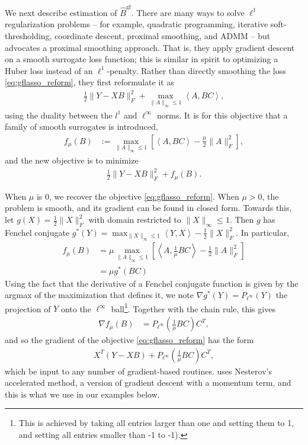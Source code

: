 \documentclass[14pt]{extarticle}
\begin{document}
We next describe estimation of $\hat{B}^{\text{gf}}$. There are many ways to
solve $\ell^{1}$ regularization problems -- for example, quadratic programming,
iterative soft-thresholding, coordinate descent, proximal smoothing, and ADMM --
but \cite{chen2010graph} advocates a proximal smoothing approach. That is, they
apply gradient descent on a smooth surrogate loss function; this is similar in
spirit to optimizing a Huber loss instead of an $\ell^{1}$-penalty. Rather than
directly smoothing the loss \ref{eq:gflasso_reform}, they first reformulate it
as
\begin{align*}
  \frac{1}{2}\|Y - XB\|_{F}^{2} + \max_{\|A\|_{\infty} \leq 1}
  \left<A, BC\right>,
\end{align*}
using the duality between the $l^{1}$ and $\ell^{\infty}$ norms. It is
for this objective that a family of smooth surrogates is introduced,
\begin{align*}
f_{\mu}\left(B\right) &:= \max_{\|A\|_{\infty} \leq 1}
\left[\left<A, BC\right> - \frac{\mu}{2}\|A\|_{F}^{2}\right],
\end{align*}
and the new objective is to minimize
\begin{align*}
\frac{1}{2}\|Y - XB\|_{F}^{2} + f_{\mu}\left(B\right).
\end{align*}

When $\mu$ is 0, we recover the objective \ref{eq:gflasso_reform}. When $\mu >
0$, the problem is smooth, and its gradient can be found in closed form. Towards
this, let $g\left(X\right) = \frac{1}{2}\|X\|_{F}^{2}$ with domain restricted to
$\|X\|_{\infty} \leq 1$. Then $g$ has Fenchel conjugate $g^{\ast}\left(Y\right)
= \max_{\|X\|_{\infty}\leq 1}\left<Y, X\right> - \frac{1}{2}\|X\|_{F}^{2}$. In
particular,
\begin{align*}
f_{\mu}\left(B\right) &=  \mu \max_{\|A\|_{\infty} \leq 1}
\left[\left<A, \frac{1}{\mu}BC\right> - \frac{1}{2}\|A\|_{F}^{2}\right] \\
&= \mu g^{\ast}\left(BC\right)
\end{align*}
Using the fact that the derivative of a Fenchel conjugate function is given by
the argmax of the maximization that defines it, we note $\nabla
g^{\ast}\left(Y\right) = P_{\ell^{\infty}}\left(Y\right)$ the projection of $Y$
onto the $\ell^{\infty}$ ball\footnote{This is achieved by taking all entries
  larger than one and setting them to 1, and setting all entries smaller than -1
  to -1).}. Together with the chain rule, this gives
\begin{align*}
  \nabla f_{\mu}\left(B\right) &= P_{\ell^{\infty}}\left(\frac{1}{\mu}BC\right)C^{T},
\end{align*}
and so the gradient of the objective \ref{eq:gflasso_reform} has the form
\begin{align*}
 X^{T}\left(Y - XB\right) + P_{\ell^{\infty}}\left(\frac{1}{\mu}BC\right)C^{T},
\end{align*}
which be input to any number of gradient-based routines. \cite{chen2010graph}
uses Nesterov's accelerated method, a version of gradient descent with a
momentum term, and this is what we use in our examples below.
\end{document}
